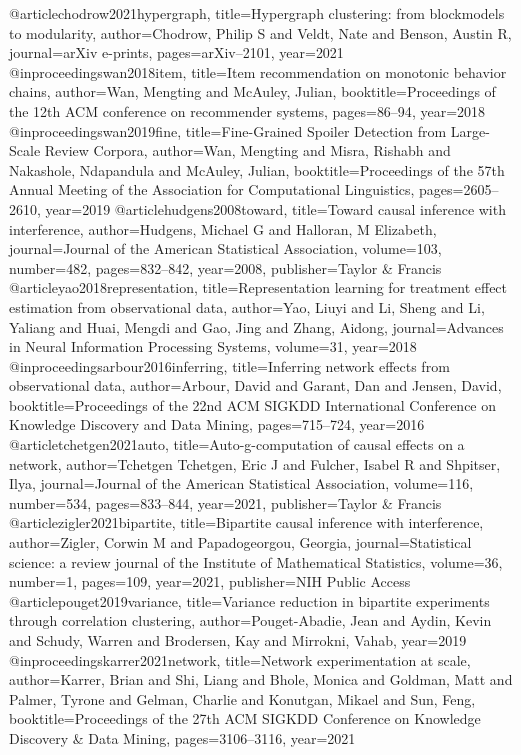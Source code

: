 @article{chodrow2021hypergraph,
  title={Hypergraph clustering: from blockmodels to modularity},
  author={Chodrow, Philip S and Veldt, Nate and Benson, Austin R},
  journal={arXiv e-prints},
  pages={arXiv--2101},
  year={2021}
}
@inproceedings{wan2018item,
  title={Item recommendation on monotonic behavior chains},
  author={Wan, Mengting and McAuley, Julian},
  booktitle={Proceedings of the 12th ACM conference on recommender systems},
  pages={86--94},
  year={2018}
}
@inproceedings{wan2019fine,
  title={Fine-Grained Spoiler Detection from Large-Scale Review Corpora},
  author={Wan, Mengting and Misra, Rishabh and Nakashole, Ndapandula and McAuley, Julian},
  booktitle={Proceedings of the 57th Annual Meeting of the Association for Computational Linguistics},
  pages={2605--2610},
  year={2019}
}
@article{hudgens2008toward,
  title={Toward causal inference with interference},
  author={Hudgens, Michael G and Halloran, M Elizabeth},
  journal={Journal of the American Statistical Association},
  volume={103},
  number={482},
  pages={832--842},
  year={2008},
  publisher={Taylor \& Francis}
}
@article{yao2018representation,
  title={Representation learning for treatment effect estimation from observational data},
  author={Yao, Liuyi and Li, Sheng and Li, Yaliang and Huai, Mengdi and Gao, Jing and Zhang, Aidong},
  journal={Advances in Neural Information Processing Systems},
  volume={31},
  year={2018}
}
@inproceedings{arbour2016inferring,
  title={Inferring network effects from observational data},
  author={Arbour, David and Garant, Dan and Jensen, David},
  booktitle={Proceedings of the 22nd ACM SIGKDD International Conference on Knowledge Discovery and Data Mining},
  pages={715--724},
  year={2016}
}
@article{tchetgen2021auto,
  title={Auto-g-computation of causal effects on a network},
  author={Tchetgen Tchetgen, Eric J and Fulcher, Isabel R and Shpitser, Ilya},
  journal={Journal of the American Statistical Association},
  volume={116},
  number={534},
  pages={833--844},
  year={2021},
  publisher={Taylor \& Francis}
}
@article{zigler2021bipartite,
  title={Bipartite causal inference with interference},
  author={Zigler, Corwin M and Papadogeorgou, Georgia},
  journal={Statistical science: a review journal of the Institute of Mathematical Statistics},
  volume={36},
  number={1},
  pages={109},
  year={2021},
  publisher={NIH Public Access}
}
@article{pouget2019variance,
  title={Variance reduction in bipartite experiments through correlation clustering},
  author={Pouget-Abadie, Jean and Aydin, Kevin and Schudy, Warren and Brodersen, Kay and Mirrokni, Vahab},
  year={2019}
}
@inproceedings{karrer2021network,
  title={Network experimentation at scale},
  author={Karrer, Brian and Shi, Liang and Bhole, Monica and Goldman, Matt and Palmer, Tyrone and Gelman, Charlie and Konutgan, Mikael and Sun, Feng},
  booktitle={Proceedings of the 27th ACM SIGKDD Conference on Knowledge Discovery \& Data Mining},
  pages={3106--3116},
  year={2021}
}